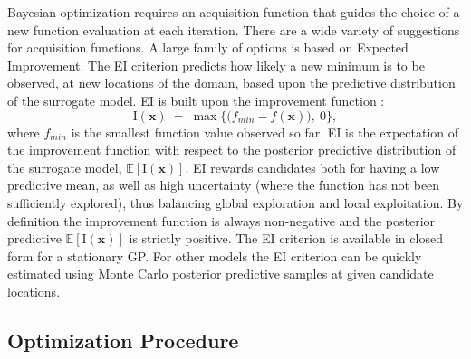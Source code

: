 \documentclass{article}
\def \Eix {
        \mathbb{E}\left[\text{I}(\bm{x})\right]
}
\def \ix {
        \text{I}(\bm{x})
}
\begin{document}
Bayesian optimization requires an acquisition function that guides the
choice of a new function evaluation at each iteration. There are a
wide variety of suggestions for acquisition functions. A large family
of options is based on Expected Improvement. 
The EI criterion predicts how likely a new minimum is to be observed, at new 
locations of the domain, based upon the predictive distribution of the 
surrogate model.  EI is built upon the improvement function \citep{jonesEIOpt}:
%
\begin{equation}
\ix~=~ \max \Big\{ \big(f_{min} - f(\bm{x})\big), ~0 \Big\},
\label{ix}
\end{equation}
%
where $f_{min}$ is the smallest function value observed so far. EI is the 
expectation of the improvement function with respect to the posterior 
predictive distribution of the surrogate model, $\Eix$. EI rewards candidates 
both for having a low predictive mean, as well as high uncertainty (where the 
function has not been sufficiently explored), thus balancing
global exploration and local exploitation. By definition the improvement 
function is always non-negative and the posterior predictive $\Eix$ is 
strictly positive. The EI criterion is available in closed form for a 
stationary GP. For other models the EI criterion can be quickly estimated using 
Monte Carlo posterior predictive samples at given candidate locations. 

%
%
\subsection{Optimization Procedure}
%
%
\end{document}

